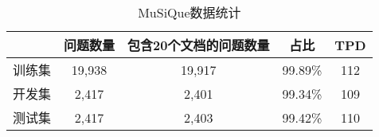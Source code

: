 \begin{table}[htbp]
    \centering
    \caption{MuSiQue数据统计}
    \label{tab:2-3}
    \begin{tabular}{ccccc}
        \hline
        & 问题数量 & 包含20个文档的问题数量 & 占比 & TPD \\
        \hline
        训练集 & 19,938 & 19,917 & 99.89\% & 112 \\
        开发集 & 2,417 & 2,401 & 99.34\% & 109 \\
        测试集 & 2,417 & 2,403 & 99.42\% & 110 \\
        \hline
    \end{tabular}
\end{table}

